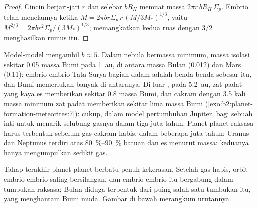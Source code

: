 \begin{proof}
Cincin berjari-jari $r$ dan selebar $bR_H$ memuat massa
$2\pi r\, bR_H\,\Sigma_p$. Embrio telah menelannya ketika
$M = 2\pi b r\Sigma_p\, r\,(M/3M_*)^{1/3}$, yaitu
$M^{2/3} = 2\pi b r^2\Sigma_p/(3M_*)^{1/3}$; memangkatkan kedua ruas dengan
$3/2$ menghasilkan rumus itu.
\end{proof}

Model-model mengambil $b \approx 5$. Dalam nebula bermassa minimum, massa isolasi sekitar
\num{0.05} massa Bumi pada \qty{1}{au}, di antara massa
Bulan (\num{0.012}) dan Mars (\num{0.11}): embrio-embrio Tata Surya bagian dalam
adalah benda-benda sebesar itu, dan Bumi memerlukan banyak di antaranya. Di luar , pada \qty{5.2}{au}, zat padat yang kaya es memberikan sekitar
\num{0.8} massa Bumi, dan cakram dengan \num{3.5} kali massa minimum
zat padat memberikan sekitar lima massa Bumi (\cref{exo:b2:planet-formation-meteorites:7}): cukup, dalam model pertumbuhan
Jupiter, bagi sebuah inti untuk menarik selubung gasnya dalam tiga juta tahun. Planet-planet
raksasa harus terbentuk sebelum gas cakram habis, dalam beberapa
juta tahun; Uranus dan Neptunus terdiri atas \qtyrange{80}{90}{\percent} batuan dan es
menurut massa: keduanya hanya mengumpulkan sedikit gas.

Tahap terakhir planet-planet berbatu penuh kekerasan. Setelah gas habis, orbit
embrio-embrio saling bersilangan, dan embrio-embrio itu bergabung dalam tumbukan raksasa; Bulan
diduga terbentuk dari puing salah satu tumbukan itu, yang menghantam Bumi
muda. Gambar di bawah merangkum urutannya.

